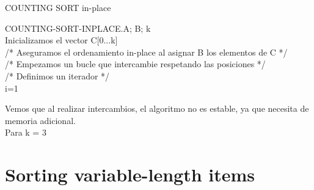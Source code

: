 \documentclass{article}
\begin{document}
\begin{enumerate}[label=(\alph*)]
  \begin{algorithm}[H]
   \caption{COUNTING SORT in-place}
   COUNTING-SORT-INPLACE.A; B; k\\
   Inicializamos el vector C[0...k]\\
   /* Aseguramos el ordenamiento in-place al asignar B los elementos de C */\\
   /* Empezamos un bucle que intercambie respetando las posiciones */\\
   /* Definimos un iterador */\\
   i=1\\
  \end{algorithm}
  
  Vemos que al realizar intercambios, el algoritmo no es estable, ya que necesita de memoria adicional.\\
  Para k = 3
  
\end{enumerate}
\section{Sorting variable-length items}
\end{document}

